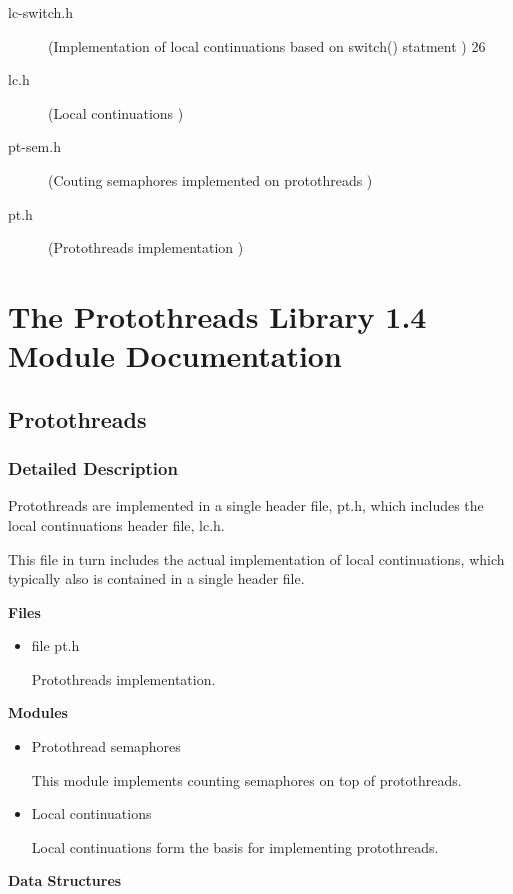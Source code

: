 \documentclass[12pt]{article}
\begin{document}
\begin{CJK}{UTF8}{bsmi}
\begin{description}
\item [lc-switch.h] (Implementation of local continuations based on switch() statment ) 26

\item[lc.h] (Local continuations ) 

\item [pt-sem.h] (Couting semaphores implemented on protothreads )
\item [pt.h] (Protothreads implementation )
\end{description} 

\section{The Protothreads Library 1.4 Module Documentation}

\subsection{Protothreads}

\subsubsection{Detailed Description}

Protothreads are implemented in a single header file, pt.h, which includes the local continuations header file, lc.h.

This file in turn includes the actual implementation of local continuations, which typically also is contained in a single header file.

\bf Files

\begin{itemize}
\item file pt.h 

Protothreads implementation.
\end{itemize}


\bf Modules

\begin{itemize}
\item Protothread semaphores 

This module implements counting semaphores on top of protothreads.

\item Local continuations 

Local continuations form the basis for implementing protothreads.
\end{itemize}

\bf Data Structures


\end{CJK}
\end{document}
